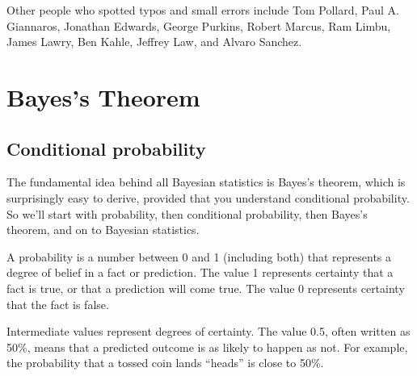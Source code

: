 \documentclass[12pt]{book}
\theoremstyle{exercise}
\begin{document}
Other people who spotted typos and small errors include
Tom Pollard,
Paul A. Giannaros,
Jonathan Edwards,
George Purkins,
Robert Marcus,
Ram Limbu,
James Lawry,
Ben Kahle,
Jeffrey Law, and
Alvaro Sanchez.

\normalsize

\newpage

\begin{latexonly}

\tableofcontents

\newpage

\end{latexonly}

\mainmatter

\newcommand{\PMF}{\mathrm{PMF}}
\newcommand{\PDF}{\mathrm{PDF}}
\newcommand{\CDF}{\mathrm{CDF}}
\newcommand{\ICDF}{\mathrm{ICDF}}

\newcommand{\p}[1]{\ensuremath{\mathrm{p}(#1)}}
\newcommand{\odds}[1]{\ensuremath{\mathrm{o}(#1)}}
\newcommand{\T}[1]{\mbox{#1}}
\newcommand{\AND}{~\mathrm{and}~}
\newcommand{\NOT}{\mathrm{not}~}


\chapter{Bayes's Theorem}
\label{intro}

\section{Conditional probability}

The fundamental idea behind all Bayesian statistics is Bayes's theorem,
which is surprisingly easy to derive, provided that you understand
conditional probability.  So we'll start with probability, then
conditional probability, then Bayes's theorem, and on to Bayesian
statistics.

A probability is a number between 0 and 1 (including both) that
represents a degree of belief in a fact or prediction.  The value
1 represents certainty that a fact is true, or that a prediction
will come true.  The value 0 represents certainty
that the fact is false.

Intermediate values represent degrees of certainty.  The value 0.5,
often written as 50\%, means that a predicted outcome is
as likely to happen as not.
For example, the probability that a tossed coin lands ``heads'' is close to 50\%.
\end{document}
